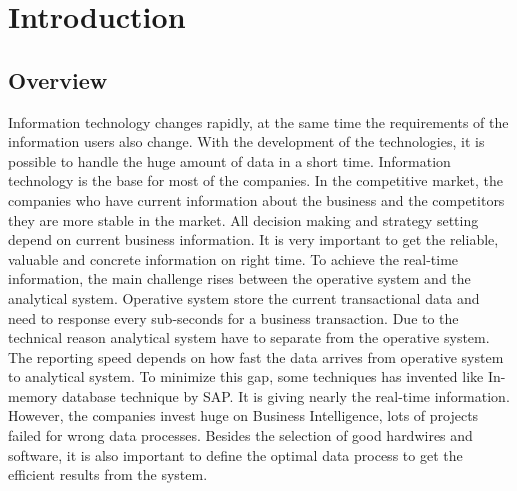 \chapter{Introduction}
\section{Overview}
Information technology changes rapidly, at the same time the requirements of the information users also change. With the development of the technologies, it is possible to handle the huge amount of data in a short time. Information technology is the base for most of the companies. In the competitive market, the companies who have current information about the business and the competitors they are more stable in the market.  All decision making and strategy setting depend on current business information. It is very important to get the reliable, valuable and concrete information on right time. 
To achieve the real-time information, the main challenge rises between the operative system and the analytical system. Operative system store the current transactional data and need to response every sub-seconds for a business transaction. Due to the technical reason analytical system have to separate from the operative system. The reporting speed depends on how fast the data arrives from operative system to analytical system. To minimize this gap, some techniques has invented like In-memory database technique by SAP. It is giving nearly the real-time information.
However, the companies invest huge on Business Intelligence, lots of projects failed for wrong data processes. Besides the selection of good hardwires and software, it is also important to define the optimal data process to get the efficient results from the system. 
 




\cite{}
